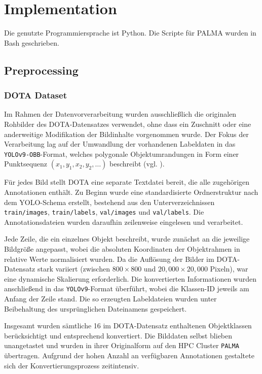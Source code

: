 \chapter{Implementation}
\label{ch:implementation}
Die genutzte Programmiersprache ist Python. Die Scripte für PALMA wurden in Bash geschrieben.
\section{Preprocessing}
\subsection{DOTA Dataset}
Im Rahmen der Datenvorverarbeitung wurden ausschließlich die originalen Rohbilder des DOTA-Datensatzes verwendet, ohne dass ein Zuschnitt oder eine anderweitige Modifikation der Bildinhalte vorgenommen wurde. Der Fokus der Verarbeitung lag auf der Umwandlung der vorhandenen Labeldaten in das \texttt{YOLOv9-OBB}-Format, welches polygonale Objektumrandungen in Form einer Punktsequenz \((x_1, y_1, x_2, y_2, \ldots)\) beschreibt (vgl. ).

Für jedes Bild stellt DOTA eine separate Textdatei bereit, die alle zugehörigen Annotationen enthält. Zu Beginn wurde eine standardisierte Ordnerstruktur nach dem YOLO-Schema erstellt, bestehend aus den Unterverzeichnissen \texttt{train/images}, \texttt{train/labels}, \texttt{val/images} und \texttt{val/labels}. Die Annotationsdateien wurden daraufhin zeilenweise eingelesen und verarbeitet.

Jede Zeile, die ein einzelnes Objekt beschreibt, wurde zunächst an die jeweilige Bildgröße angepasst, wobei die absoluten Koordinaten der Objektrahmen in relative Werte normalisiert wurden. Da die Auflösung der Bilder im DOTA-Datensatz stark variiert (zwischen \(800 \times 800\) und \(20{,}000 \times 20{,}000\) Pixeln), war eine dynamische Skalierung erforderlich. Die konvertierten Informationen wurden anschließend in das \texttt{YOLOv9}-Format überführt, wobei die Klassen-ID jeweils am Anfang der Zeile stand. Die so erzeugten Labeldateien wurden unter Beibehaltung des ursprünglichen Dateinamens gespeichert.

Insgesamt wurden sämtliche 16 im DOTA-Datensatz enthaltenen Objektklassen berücksichtigt und entsprechend konvertiert. Die Bilddaten selbst blieben unangetastet und wurden in ihrer Originalform auf den HPC Cluster \texttt{PALMA} übertragen. Aufgrund der hohen Anzahl an verfügbaren Annotationen gestaltete sich der Konvertierungsprozess zeitintensiv.

